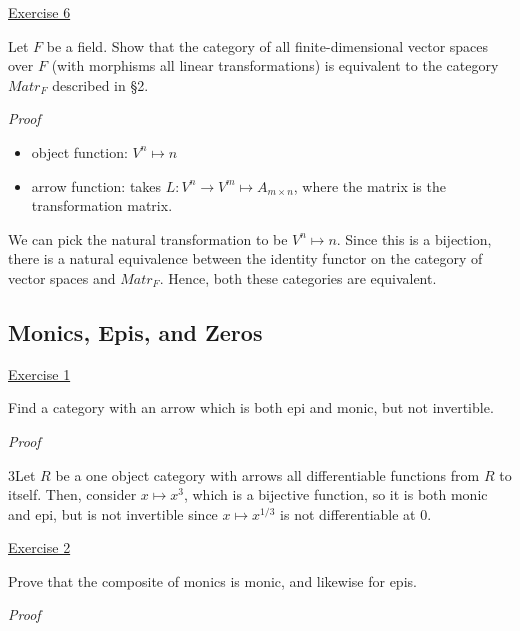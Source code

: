 \documentclass[11pt]{article}
\begin{document}
\vspace{2mm}
\noindent
\underline{Exercise 6}
\vspace{2mm}

Let $F$ be a field. Show that the category of all finite-dimensional vector spaces
over $F$ (with morphisms all linear transformations) is equivalent to the category
$Matr_F$ described in §2.

\vspace{2mm}
\noindent
\emph{Proof}

\begin{itemize}
	\item object function: $V^n \mapsto n$
	\item arrow function: takes $L : V^n \to V^m \mapsto A_{m \times n}$, where the matrix is the transformation matrix.  
\end{itemize}

We can pick the natural transformation to be $V^n \mapsto n$. Since this is a bijection, there is a natural equivalence between the identity functor on the category of vector spaces and $Matr_F$. Hence, both these categories are equivalent.


\newpage
\subsection{Monics, Epis, and Zeros}


\vspace{2mm}
\noindent
\underline{Exercise 1}
\vspace{2mm}

Find a category with an arrow which is both epi and monic, but not invertible.

\vspace{2mm}
\noindent
\emph{Proof}

3Let $R$ be a one object category with arrows all differentiable functions from $R$ to itself. Then, consider $x \mapsto x^3$, which is a bijective function, so it is both monic and epi, but is not invertible since $x \mapsto x^{1/3}$ is not differentiable at $0$.



\vspace{2mm}
\noindent
\underline{Exercise 2}
\vspace{2mm}

Prove that the composite of monics is monic, and likewise for epis.

\vspace{2mm}
\noindent
\emph{Proof}
\end{document}
